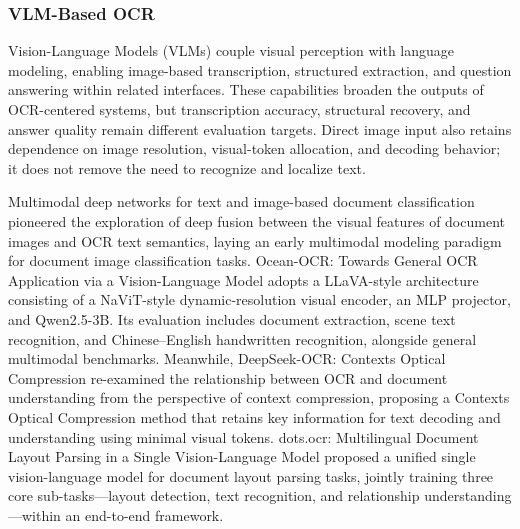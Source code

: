 \subsubsection{VLM-Based OCR}
Vision-Language Models (VLMs) couple visual perception with language modeling, enabling image-based transcription, structured extraction, and question answering within related interfaces. These capabilities broaden the outputs of OCR-centered systems, but transcription accuracy, structural recovery, and answer quality remain different evaluation targets. Direct image input also retains dependence on image resolution, visual-token allocation, and decoding behavior; it does not remove the need to recognize and localize text.

Multimodal deep networks for text and image-based document classification \cite{nguyen2019multimodal} pioneered the exploration of deep fusion between the visual features of document images and OCR text semantics, laying an early multimodal modeling paradigm for document image classification tasks. Ocean-OCR: Towards General OCR Application via a Vision-Language Model \cite{ocean_ocr_2024} adopts a LLaVA-style architecture consisting of a NaViT-style dynamic-resolution visual encoder, an MLP projector, and Qwen2.5-3B. Its evaluation includes document extraction, scene text recognition, and Chinese--English handwritten recognition, alongside general multimodal benchmarks. Meanwhile, DeepSeek-OCR: Contexts Optical Compression \cite{deepseek2025ocr} re-examined the relationship between OCR and document understanding from the perspective of context compression, proposing a Contexts Optical Compression method that retains key information for text decoding and understanding using minimal visual tokens. dots.ocr: Multilingual Document Layout Parsing in a Single Vision-Language Model \cite{wang2025dotsocr} proposed a unified single vision-language model for document layout parsing tasks, jointly training three core sub-tasks—layout detection, text recognition, and relationship understanding—within an end-to-end framework.

